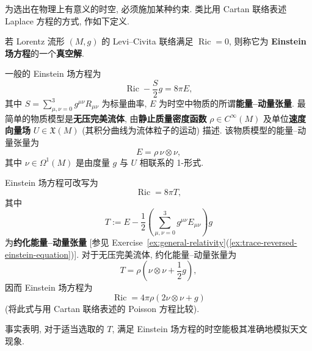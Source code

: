 为选出在物理上有意义的时空, 必须施加某种约束. 类比用 Cartan 联络表述 Laplace 方程的方式, 作如下定义.

\begin{RiemannDefinition}\label{def:vacuum-einstein-field-equation}
若 Lorentz 流形 $(M,g)$ 的 Levi–Civita 联络满足 $\operatorname{Ric}=0$, 则称它为 \textbf{Einstein 场方程}的一个\textbf{真空解}.
\end{RiemannDefinition}

一般的 Einstein 场方程为
\[
  \operatorname{Ric}-\frac{S}{2}g=8\pi E,
\]
其中 $S=\sum_{\mu,\nu=0}^3g^{\mu\nu}R_{\mu\nu}$ 为标量曲率, $E$ 为时空中物质的所谓\textbf{能量--动量张量}. 最简单的物质模型是\textbf{无压完美流体}, 由\textbf{静止质量密度函数} $\rho\in C^\infty(M)$ 及单位\textbf{速度向量场} $U\in\mathfrak{X}(M)$ (其积分曲线为流体粒子的运动) 描述. 该物质模型的能量--动量张量为
\[
  E=\rho\,\nu\otimes\nu,
\]
其中 $\nu\in\Omega^1(M)$ 是由度量 $g$ 与 $U$ 相联系的 1-形式.

Einstein 场方程可改写为
\[
  \operatorname{Ric}=8\pi T,
\]
其中
\[
  T:=E-\frac{1}{2}\left(\sum_{\mu,\nu=0}^3g^{\mu\nu}E_{\mu\nu}\right)g
\]
为\textbf{约化能量--动量张量} [参见 Exercise~\ref{ex:general-relativity}(\ref{ex:trace-reversed-einstein-equation})]. 对于无压完美流体, 约化能量--动量张量为
\[
  T=\rho\left(\nu\otimes\nu+\frac{1}{2}g\right),
\]
因而 Einstein 场方程为
\[
  \operatorname{Ric}=4\pi\rho(2\nu\otimes\nu+g)
\]
(将此式与用 Cartan 联络表述的 Poisson 方程比较).

事实表明, 对于适当选取的 $T$, 满足 Einstein 场方程的时空能极其准确地模拟天文现象.

